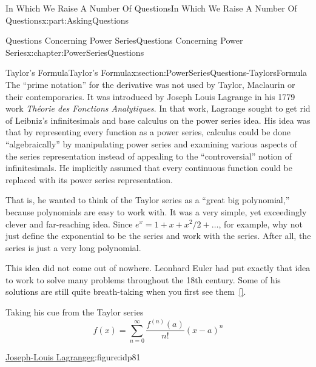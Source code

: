 \documentclass[oneside,10pt,]{book}
\newcommand{\xreffont}{\relax}
\numberwithin{equation}{section}
\begin{document}
\begin{partptx}{In Which We Raise A Number Of Questions}{}{In Which We Raise A Number Of Questions}{}{}{x:part:AskingQuestions}
\begin{chapterptx}{Questions Concerning Power Series}{}{Questions Concerning Power Series}{}{}{x:chapter:PowerSeriesQuestions}
\begin{sectionptx}{Taylor's Formula}{}{Taylor's Formula}{}{}{x:section:PowerSeriesQuestions-TaylorsFormula}
The ``prime notation'' for the derivative was not used by Taylor,  Maclaurin or their contemporaries. It was introduced by Joseph Louis Lagrange  in his 1779 work \textit{Théorie des Fonctions Analytiques}. In that work, Lagrange sought to get rid of Leibniz's infinitesimals and base calculus on the power series idea. His idea was that by representing every function as a power series, calculus could be done ``algebraically'' by manipulating power series and examining various aspects of the series representation instead of appealing to the ``controversial'' notion of infinitesimals. He implicitly assumed that every continuous function could be replaced with its power series representation.%
\par
That is, he wanted to think of the Taylor series as a ``great big polynomial,'' because polynomials are easy to work with. It was a very simple, yet exceedingly clever and far-reaching idea. Since \(e^x = 1 +x +x^2/2 +\ldots\), for example, why not just define the exponential to be the series and work with the series. After all, the series is just a very long polynomial.%
\par
This idea did not come out of nowhere. Leonhard Euler  had put exactly that idea to work to solve many problems throughout the 18th century. Some of his solutions are still quite breath-taking when you first see them~\hyperlink{x:biblio:sandifer07__early_mathem_leonar_euler}{[{\xreffont 14}]}.%
\par
Taking his cue from the Taylor series%
\begin{equation*}
f(x) = \sum_{n=0}^\infty\frac{f^{(n)}(a)}{n!}(x-a)^n
\end{equation*}
%
\begin{figureptx}{\href{https://mathshistory.st-andrews.ac.uk/Biographies/Lagrange/}{Joseph-Louis Lagrange}\protect\footnotemark{}}{g:figure:idp81}{}%
%
\begin{image}{0.325}{0.35}{0.325}%

\end{image}
\end{figureptx}
\end{sectionptx}
\end{chapterptx}
\end{partptx}
\end{document}
